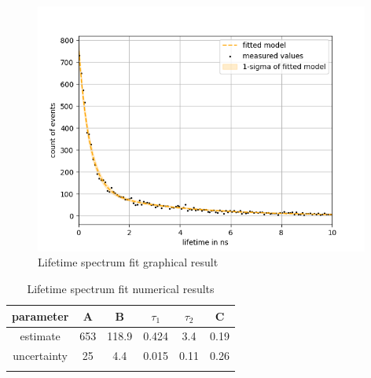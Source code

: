 \begin{figure}[]
    \centering
    \includegraphics[width=110mm,scale=0.5]{Positronium/include/lifetimefit.png}
    \caption{Lifetime spectrum fit graphical result} 
    \label{fig:lifetime}
\end{figure}

\begin{table}[H]
    \centering
    \caption{Lifetime spectrum fit numerical results}
    \begin{tabular}{cccccc}
         parameter & A& B & $\tau_1$ & $\tau_2$ & C\\ \hline
         estimate & 653 & 118.9 & 0.424 & 3.4 & 0.19\\
         uncertainty & 25 & 4.4& 0.015& 0.11& 0.26 \\\hline \\
    \end{tabular}
    \label{tab:lifetime}
\end{table}

